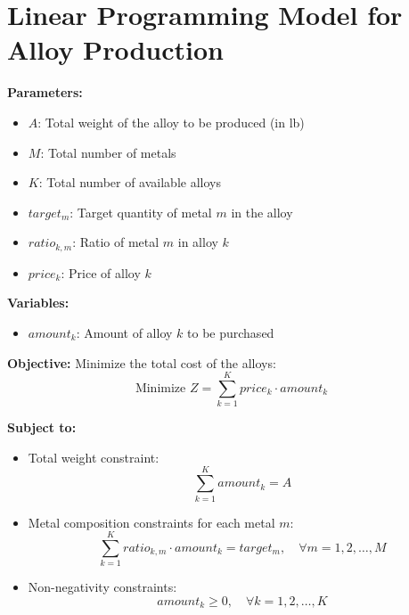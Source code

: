 \documentclass{article}
\begin{document}
\section*{Linear Programming Model for Alloy Production}

\textbf{Parameters:}
\begin{itemize}
    \item $A$: Total weight of the alloy to be produced (in lb)
    \item $M$: Total number of metals
    \item $K$: Total number of available alloys
    \item $target_{m}$: Target quantity of metal $m$ in the alloy
    \item $ratio_{k,m}$: Ratio of metal $m$ in alloy $k$
    \item $price_{k}$: Price of alloy $k$
\end{itemize}

\textbf{Variables:}
\begin{itemize}
    \item $amount_{k}$: Amount of alloy $k$ to be purchased
\end{itemize}

\textbf{Objective:}
Minimize the total cost of the alloys:
\begin{equation}
\text{Minimize } Z = \sum_{k=1}^{K} price_{k} \cdot amount_{k}
\end{equation}

\textbf{Subject to:}
\begin{itemize}
    \item Total weight constraint:
    \begin{equation}
    \sum_{k=1}^{K} amount_{k} = A
    \end{equation}

    \item Metal composition constraints for each metal $m$:
    \begin{equation}
    \sum_{k=1}^{K} ratio_{k,m} \cdot amount_{k} = target_{m}, \quad \forall m = 1, 2, \ldots, M
    \end{equation}

    \item Non-negativity constraints:
    \begin{equation}
    amount_{k} \geq 0, \quad \forall k = 1, 2, \ldots, K
    \end{equation}
\end{itemize}
\end{document}
